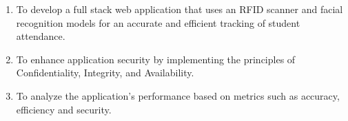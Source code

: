 \begin{comment}
How to formulate your research objectives:
1. Identify what research steps do you need to perform to achieve your general objective.
2. Identify the questions that must be answered for you to achieve your general objective.
    Thereafter, convert these questions into action statements

Example #1:

Research Question:
  What are the general features of a web-based learning environment?

Specific Objective:
   To review existing web-based learning environment that teaches language learning for children


Example #2:

Research Question:
   How will you represent commonsense knowledge for use by computer systems?

Specific Objective:
   To identify knowledge representation approaches used by existing story generation systems

Example #3:
Research Question:
   What types of storytelling knowledge are needed to generate stories?

Specific Objective:
    To identify the different types of storytelling knowledge used in generating stories

Example #4:
Research Question:
    What machine learning approaches will you utilize?

Specific Objective:
    To determine existing machine learning algorithms [that can be used in training the computer system to detect cyberbullying cases] 

Example #5: Research Question:
    How will your research output be evaluated?

Specific Objective:
    To define evaluation metrics for validating the accuracy of the translation

\end{comment}

%
%

\begin{enumerate}
   \item To develop a full stack web application that uses an RFID scanner and facial recognition models for an accurate and efficient tracking of student attendance.
   \item To enhance application security by implementing the principles of Confidentiality, Integrity, and Availability.
   \item To analyze the application's performance based on metrics such as accuracy, efficiency and security.
\end{enumerate}


